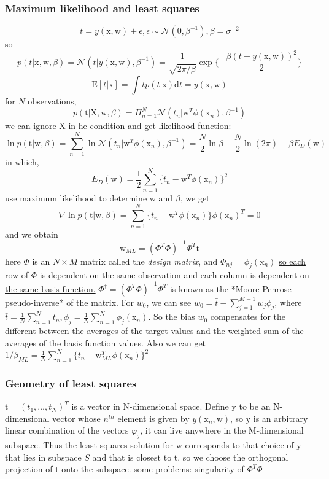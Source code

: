 \documentclass[a4paper]{book}
\begin{document}
\subsubsection{Maximum likelihood and least squares}
$$t = y(\mathrm x,\mathrm w)+\epsilon, \epsilon\sim\mathcal N(0,\beta^{-1}), \beta = \sigma^{-2}$$
so $$p(t|\mathrm x,\mathrm w,\beta) = \mathcal N(t|y(\mathrm x,\mathrm w),\beta^{-1})=\frac{1}{\sqrt{2\pi/\beta}}\exp\{-\frac{\beta(t-y(\mathrm x,\mathrm w))^2}{2}\}$$
$$\mathrm E[t|\mathrm x] =\int t p(t|\mathrm x)\mathrm dt=y(\mathrm x,\mathrm w)$$
for $N$ observations,
$$p(\mathrm t|\mathrm X,\mathrm w,\beta) = \Pi_{n=1}^N\mathcal N(t_n|\mathrm w^T\phi(\mathrm x_n), \beta^{-1})$$
we can ignore $\mathrm X$ in he condition and get likelihood function:
$$\ln p(\mathrm t|\mathrm w,\beta) = \sum_{n=1}^N\ln \mathcal N(t_n|\mathrm w^T\phi(\mathrm x_n),\beta^{-1}) = \frac N2\ln\beta-\frac N2\ln(2\pi)-\beta E_D(\mathrm w)$$
in which, $$E_D(\mathrm w) = \frac12\sum_{n=1}^N\{t_n-\mathrm w^T\phi(\mathrm x_n)\}^2$$
use maximum likelihood to determine $\mathrm w$ and $\beta$, we get
\begin{equation}\label{3.2.2}
  \nabla \ln p(\mathrm t|\mathrm w,\beta) = \sum_{n=1}^N\{t_n-\mathrm w^T\phi(\mathrm x_n)\}\phi(\mathrm x_n)^T = 0
\end{equation}
and we obtain
$$\mathrm w_{ML} = (\Phi^T\Phi)^{-1}\Phi^T\mathrm t$$
here $\Phi$ is an $N\times M$ matrix called the \emph{design matrix}, and $\Phi_{nj} = \phi_j(\mathrm x_n)$
\uline{so each row of $\Phi$ is dependent on the same observation and each column is dependent on the same basis function.} \newline
$\Phi^{\dagger} = (\Phi^T\Phi)^{-1}\Phi^T$ is known as the *Moore-Penrose pseudo-inverse* of the matrix.\newline
For $w_0$, we can see $w_0=\bar t-\sum_{j=1}^{M-1}w_j\bar \phi_j$, where $\bar t=\frac1N\sum_{n=1}^Nt_n, \bar{\phi_j}=\frac1N\sum_{n=1}^N\phi_j(\mathrm x_n)$. So the bias $w_0$ compensates for the different between the averages of the target values and the weighted sum of the averages of the basis function values. Also we can get$1/\beta_{ML}=\frac1N\sum_{n=1}^N\{t_n-\mathrm w_{ML}^T\phi(\mathrm x_n)\}^2$
\subsubsection{Geometry of least squares}
$\mathrm t=(t_1,\dots,t_N)^T$ is a vector in N-dimensional space. Define $\mathrm y$ to be an N-dimensional vector whose $n^{th}$ element is given by $y(\mathrm x_n,\mathrm w)$,  so $\mathrm y$ is an arbitrary linear combination of the vectors $\varphi_j$, it can live anywhere in the M-dimensional subspace.\newline
Thus the least-squares solution for $\mathrm  w $ corresponds to that choice of $\mathrm y$ that lies in subspace $S$ and that is closest to t. so we choose the orthogonal projection of $\mathrm t$  onto the subspace.\newline
some problems: singularity of $\Phi^T\Phi$
\end{document}
